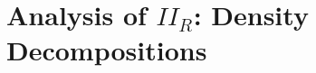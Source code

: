 \documentclass[dvipsnames,letterpaper,12pt]{article}
\DeclareMathOperator{\RR}{\mathbb{R}}
\DeclareMathOperator{\CC}{\mathbb{C}}
\begin{document}
\begin{comment}

\end{comment}





\section{Analysis of $II_R$: Density Decompositions}

\end{document}
